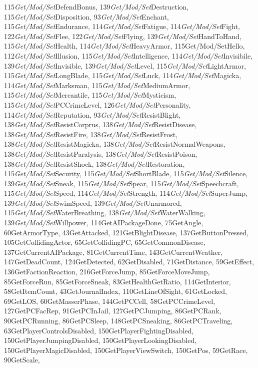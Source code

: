 \documentclass[
]{article}
\begin{document}
115\emph{Get/Mod/Set}DefendBonus, 139\emph{Get/Mod/Set}Destruction,
115\emph{Get/Mod/Set}Disposition, 93\emph{Get/Mod/Set}Enchant,
115\emph{Get/Mod/Set}Endurance, 114\emph{Get/Mod/Set}Fatigue,
114\emph{Get/Mod/Set}Fight, 122\emph{Get/Mod/Set}Flee,
122\emph{Get/Mod/Set}Flying, 139\emph{Get/Mod/Set}HandToHand,
115\emph{Get/Mod/Set}Health, 114\emph{Get/Mod/Set}HeavyArmor,
115Get/Mod/SetHello, 112\emph{Get/Mod/Set}Illusion,
115\emph{Get/Mod/Set}Intelligence, 114\emph{Get/Mod/Set}Invisibile,
139\emph{Get/Mod/Set}Invisible, 139\emph{Get/Mod/Set}Level,
115\emph{Get/Mod/Set}LightArmor, 115\emph{Get/Mod/Set}LongBlade,
115\emph{Get/Mod/Set}Luck, 114\emph{Get/Mod/Set}Magicka,
114\emph{Get/Mod/Set}Marksman, 115\emph{Get/Mod/Set}MediumArmor,
115\emph{Get/Mod/Set}Mercantile, 115\emph{Get/Mod/Set}Mysticism,
115\emph{Get/Mod/Set}PCCrimeLevel, 126\emph{Get/Mod/Set}Personality,
114\emph{Get/Mod/Set}Reputation, 93\emph{Get/Mod/Set}ResistBlight,
138\emph{Get/Mod/Set}ResistCorprus, 138\emph{Get/Mod/Set}ResistDisease,
138\emph{Get/Mod/Set}ResistFire, 138\emph{Get/Mod/Set}ResistFrost,
138\emph{Get/Mod/Set}ResistMagicka,
138\emph{Get/Mod/Set}ResistNormalWeapons,
138\emph{Get/Mod/Set}ResistParalysis, 138\emph{Get/Mod/Set}ResistPoison,
138\emph{Get/Mod/Set}ResistShock, 138\emph{Get/Mod/Set}Restoration,
115\emph{Get/Mod/Set}Security, 115\emph{Get/Mod/Set}ShortBlade,
115\emph{Get/Mod/Set}Silence, 139\emph{Get/Mod/Set}Sneak,
115\emph{Get/Mod/Set}Spear, 115\emph{Get/Mod/Set}Speechcraft,
115\emph{Get/Mod/Set}Speed, 114\emph{Get/Mod/Set}Strength,
114\emph{Get/Mod/Set}SuperJump, 139\emph{Get/Mod/Set}SwimSpeed,
139\emph{Get/Mod/Set}Unarmored, 115\emph{Get/Mod/Set}WaterBreathing,
138\emph{Get/Mod/Set}WaterWalking, 139\emph{Get/Mod/Set}Willpower,
114GetAIPackageDone, 75GetAngle, 60GetArmorType, 43GetAttacked,
121GetBlightDisease, 137GetButtonPressed, 105GetCollidingActor,
65GetCollidingPC, 65GetCommonDisease, 137GetCurrentAIPackage,
81GetCurrentTime, 143GetCurrentWeather, 147GetDeadCount, 124GetDetected,
62GetDisabled, 71GetDistance, 59GetEffect, 136GetFactionReaction,
216GetForceJump, 85GetForceMoveJump, 85GetForceRun, 85GetForceSneak,
83GetHealthGetRatio, 114GetInterior, 58GetItemCount, 43GetJournalIndex,
110GetLineOfSight, 61GetLocked, 69GetLOS, 60GetMasserPhase,
144GetPCCell, 58GetPCCrimeLevel, 127GetPCFacRep, 91GetPCInJail,
127GetPCJumping, 86GetPCRank, 90GetPCRunning, 86GetPCSleep,
148GetPCSneaking, 86GetPCTraveling, 63GetPlayerControlsDisabled,
150GetPlayerFightingDisabled, 150GetPlayerJumpingDisabled,
150GetPlayerLookingDisabled, 150GetPlayerMagicDisabled,
150GetPlayerViewSwitch, 150GetPos, 59GetRace, 90GetScale,
\end{document}
